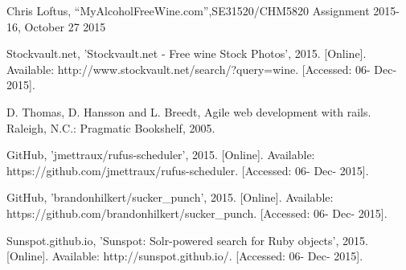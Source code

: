 \documentclass[12pt]{article}
\begin{document}
\clearpage


\begin{thebibliography}{5}

 Chris Loftus, ``MyAlcoholFreeWine.com'',SE31520/CHM5820 Assignment 2015-16, October 27 2015

 Stockvault.net, 'Stockvault.net - Free wine Stock Photos', 2015. [Online]. Available: http://www.stockvault.net/search/?query=wine. [Accessed: 06- Dec- 2015].

 D. Thomas, D. Hansson and L. Breedt, Agile web development with rails. Raleigh, N.C.: Pragmatic Bookshelf, 2005.

 GitHub, 'jmettraux/rufus-scheduler', 2015. [Online]. Available: https://github.com/jmettraux/rufus-scheduler. [Accessed: 06- Dec- 2015].

 GitHub, 'brandonhilkert/sucker\_punch', 2015. [Online]. Available: https://github.com/brandonhilkert/sucker\_punch. [Accessed: 06- Dec- 2015].

  Sunspot.github.io, 'Sunspot: Solr-powered search for Ruby objects', 2015. [Online]. Available: http://sunspot.github.io/. [Accessed: 06- Dec- 2015].

\end{thebibliography}
\end{document}
